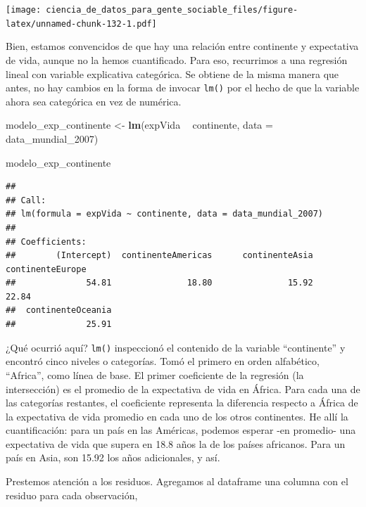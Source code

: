 \documentclass[spanish,]{book}
\newenvironment{Shaded}{\begin{snugshade}}{\end{snugshade}}
\newcommand{\DataTypeTok}[1]{\textcolor[rgb]{0.13,0.29,0.53}{#1}}
\newcommand{\DecValTok}[1]{\textcolor[rgb]{0.00,0.00,0.81}{#1}}
\newcommand{\KeywordTok}[1]{\textcolor[rgb]{0.13,0.29,0.53}{\textbf{#1}}}
\newcommand{\NormalTok}[1]{#1}
\newcommand{\OperatorTok}[1]{\textcolor[rgb]{0.81,0.36,0.00}{\textbf{#1}}}
\newcommand{\StringTok}[1]{\textcolor[rgb]{0.31,0.60,0.02}{#1}}
\begin{document}
\texttt{[image: ciencia\_de\_datos\_para\_gente\_sociable\_files/figure-latex/unnamed-chunk-132-1.pdf]}

Bien, estamos convencidos de que hay una relación entre continente y expectativa de vida, aunque no la hemos cuantificado. Para eso, recurrimos a una regresión lineal con variable explicativa categórica. Se obtiene de la misma manera que antes, no hay cambios en la forma de invocar \texttt{lm()} por el hecho de que la variable ahora sea categórica en vez de numérica.

\begin{Shaded}
\begin{Highlighting}[]
\NormalTok{modelo_exp_continente <-}\StringTok{ }\KeywordTok{lm}\NormalTok{(expVida }\OperatorTok{~}\StringTok{ }\NormalTok{continente, }\DataTypeTok{data =}\NormalTok{ data_mundial_}\DecValTok{2007}\NormalTok{)}


\NormalTok{modelo_exp_continente}
\end{Highlighting}
\end{Shaded}

\begin{verbatim}
## 
## Call:
## lm(formula = expVida ~ continente, data = data_mundial_2007)
## 
## Coefficients:
##        (Intercept)  continenteAmericas      continenteAsia    continenteEurope  
##              54.81               18.80               15.92               22.84  
##  continenteOceania  
##              25.91
\end{verbatim}

¿Qué ocurrió aquí? \texttt{lm()} inspeccionó el contenido de la variable ``continente'' y encontró cinco niveles o categorías. Tomó el primero en orden alfabético, ``Africa'', como línea de base. El primer coeficiente de la regresión (la intersección) es el promedio de la expectativa de vida en África. Para cada una de las categorías restantes, el coeficiente representa la diferencia respecto a África de la expectativa de vida promedio en cada uno de los otros continentes. He allí la cuantificación: para un país en las Américas, podemos esperar -en promedio- una expectativa de vida que supera en 18.8 años la de los países africanos. Para un país en Asia, son 15.92 los años adicionales, y así.

Prestemos atención a los residuos. Agregamos al dataframe una columna con el residuo para cada observación,

\begin{Shaded}
\end{Shaded}
\end{document}
